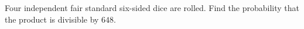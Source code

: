 Four independent fair standard six-sided dice are rolled. Find the probability that the product is divisible by $648$.
